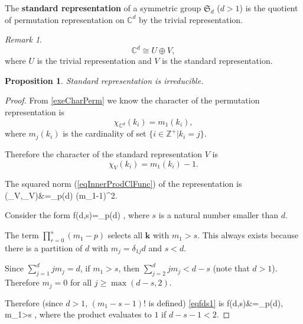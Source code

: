 \documentclass[12pt, letterpaper]{article}
\newcommand{\inte}{\mathbb{Z}}
\newcommand{\co}{\mathbb{C}}
\newenvironment{eqlong}{\equation\aligned}{\endaligned\endequation}
\newtheorem{prop}{Proposition}[section]
\theoremstyle{definition}
\theoremstyle{remark}
\newtheorem*{rem*}{Remark}
\theoremstyle{definition}
\theoremstyle{plain}
\numberwithin{equation}{section}
\begin{document}
	\begin{def*}
		The \textbf{standard representation} of a symmetric group $\mathfrak{S}_d$ ($d>1$)
		is the quotient of permutation representation on $\co^d$
		by the trivial representation.
	\end{def*}
	\begin{rem*}
		\[\co^d \cong U \oplus V, \]
		where $U$ is the trivial representation
		and $V$ is the standard representation.
	\end{rem*}
	\begin{prop}\label{propIrrStdRep}
		Standard representation is irreducible.
	\end{prop}
	\begin{proof}
		From \autoref{exeCharPerm} we know the character of the permutation representation is
		\[\chi_{\co^d}(k_i) = m_1(k_i), \]
		where $m_j(k_i)$ is the cardinality of set $\{i\in\inte^+|k_i=j\}$.
		
		Therefore the character of the standard representation $V$ is
		\begin{equation}
			\chi_V(k_i)=m_1(k_i)-1.
		\end{equation}
	
		The squared norm (\autoref{eqInnerProdClFunc}) of the representation is
		\begin{eqlong}\label{eqchiVchiV}
			(\chi_V,\chi_V)&=\sum_{\in p(d)}  (m_1-1)^2.\\
		\end{eqlong}
	
		Consider the form
		\begin{eqlong}\label{eqfds1}
			f(d,s)=\sum_{\in p(d)} \left[\frac{1}{\prod_{j=1}^d j^{m_j}m_j! } \prod_{r=0}^s(m_1-r)\right],
		\end{eqlong}
		where $s$ is a natural number smaller than $d$.
		
		The term $\prod_{r=0}^s(m_1-p)$ selects all $\mathbf{k}$ with $m_1>s$.
		This always exists because there is a partition of $d$ with $m_j=\delta_{1j} d$ and $s<d$.
				
		
		Since $\sum_{j=1}^{d}jm_j=d$, if $m_1>s$, then $\sum_{j=2}^{d}jm_j<d-s$ (note that $d>1$).
		Therefore $m_j=0$ for all $j\ge\max(d-s,2)$.
		
		Therefore (since $d>1$, $(m_1-s-1)!$ is defined) \eqref{eqfds1} is
		\begin{eqlong}\label{eqfds2}
			f(d,s)&=\sum_{\in p(d), m_1>s} \left[\frac{1}{(m_1-s-1)!\prod_{j=2}^{d-s-1} j^{m_j}m_j! } \right],
		\end{eqlong}
		where the product evaluates to $1$ if $d-s-1<2$.
		

\end{proof}
\end{document}
